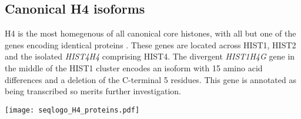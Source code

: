   \subsection{Canonical H4 isoforms}
    H4 is the most homegenous of all canonical core histones,
    with all but one of the \HFourCodingGenes{} genes encoding identical proteins .
    These genes are located across HIST1, HIST2 and the isolated \textit{HIST4H4} comprising HIST4.
    The divergent \textit{HIST1H4G} gene in the middle of the HIST1 cluster
    encodes an isoform with 15 amino acid differences and a deletion of the C-terminal 5 residues.
    This gene is annotated as being transcribed so merits further investigation.

    \begin{TableAndFigure*}
      \label{tab:H4-consensus}
      
      \label{fig:H4-weblogo}
      \texttt{[image: seqlogo\_H4\_proteins.pdf]}
    \end{TableAndFigure*}

